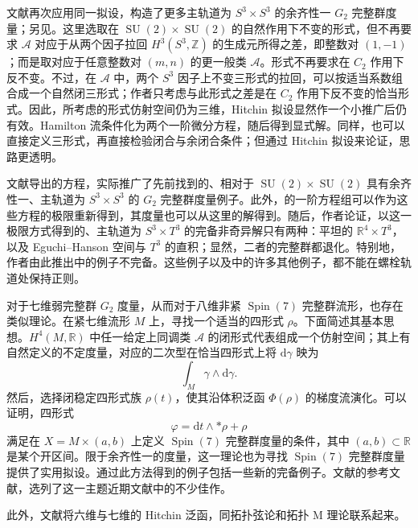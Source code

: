 文献再次应用同一拟设，构造了更多主轨道为 $S^3\times S^3$ 的余齐性一 $G_2$ 完整群度量；另见。这里选取在 $\operatorname{SU}(2)\times\operatorname{SU}(2)$ 的自然作用下不变的形式，但不再要求 $\mathcal A$ 对应于从两个因子拉回 $H^3(S^3,\mathbb Z)$ 的生成元所得之差，即整数对 $(1,-1)$；而是取对应于任意整数对 $(m,n)$ 的更一般类 $\mathcal A$。形式不再要求在 $C_2$ 作用下反不变。不过，在 $\mathcal A$ 中，两个 $S^3$ 因子上不变三形式的拉回，可以按适当系数组合成一个自然闭三形式；作者只考虑与此形式之差是在 $C_2$ 作用下反不变的恰当形式。因此，所考虑的形式仿射空间仍为三维，Hitchin 拟设显然作一个小推广后仍有效。Hamilton 流条件化为两个一阶微分方程，随后得到显式解。同样，也可以直接定义三形式，再直接检验闭合与余闭合条件；但通过 Hitchin 拟设来论证，思路更透明。

文献导出的方程，实际推广了先前找到的、相对于 $\operatorname{SU}(2)\times\operatorname{SU}(2)$ 具有余齐性一、主轨道为 $S^3\times S^3$ 的 $G_2$ 完整群度量例子。此外，的一阶方程组可以作为这些方程的极限重新得到，其度量也可以从这里的解得到。随后，作者论证，以这一极限方式得到的、主轨道为 $S^3\times T^3$ 的完备非奇异解只有两种：平坦的 $\mathbb R^4\times T^3$，以及 Eguchi--Hanson 空间与 $T^3$ 的直积；显然，二者的完整群都退化。特别地，作者由此推出中的例子不完备。这些例子以及中的许多其他例子，都不能在螺栓轨道处保持正则。

对于七维弱完整群 $G_2$ 度量，从而对于八维非紧 $\operatorname{Spin}(7)$ 完整群流形，也存在类似理论。在紧七维流形 $M$ 上，寻找一个适当的四形式 $\rho$。下面简述其基本思想。$H^4(M,\mathbb R)$ 中任一给定上同调类 $\mathcal A$ 的闭形式代表组成一个仿射空间；其上有自然定义的不定度量，对应的二次型在恰当四形式上将 $\mathrm d\gamma$ 映为
\[
\int_M\gamma\wedge\mathrm d\gamma.
\]
然后，选择闭稳定四形式族 $\rho(t)$，使其沿体积泛函 $\Phi(\rho)$ 的梯度流演化。可以证明，四形式
\[
\varphi=\mathrm dt\wedge*\rho+\rho
\]
满足在 $X=M\times(a,b)$ 上定义 $\operatorname{Spin}(7)$ 完整群度量的条件，其中 $(a,b)\subset\mathbb R$ 是某个开区间。限于余齐性一的度量，这一理论也为寻找 $\operatorname{Spin}(7)$ 完整群度量提供了实用拟设。通过此方法得到的例子包括一些新的完备例子。文献的参考文献，选列了这一主题近期文献中的不少佳作。

此外，文献将六维与七维的 Hitchin 泛函，同拓扑弦论和拓扑 M 理论联系起来。

